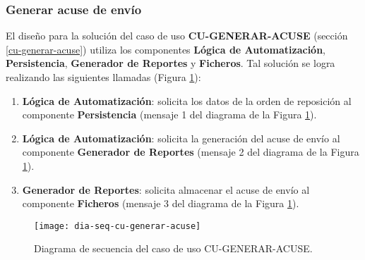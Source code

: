 \subsubsection{Generar acuse de envío}
El diseño para la solución del caso de uso \textbf{CU-GENERAR-ACUSE} (sección \ref{cu-generar-acuse}) utiliza los componentes \textbf{Lógica de Automatización}, \textbf{Persistencia}, \textbf{Generador de Reportes} y \textbf{Ficheros}. Tal solución se logra realizando las siguientes llamadas (Figura \ref{fig:dia-seq-cu-generar-acuse}):
\begin{enumerate}
	\item \textbf{Lógica de Automatización}: solicita los datos de la orden de reposición al componente \textbf{Persistencia} (mensaje 1 del diagrama de la Figura \ref{fig:dia-seq-cu-generar-acuse}).
	\item \textbf{Lógica de Automatización}: solicita la generación del acuse de envío al componente \textbf{Generador de Reportes} (mensaje 2 del diagrama de la Figura \ref{fig:dia-seq-cu-generar-acuse}).
	\item \textbf{Generador de Reportes}: solicita almacenar el acuse de envío al componente \textbf{Ficheros} (mensaje 3 del diagrama de la Figura \ref{fig:dia-seq-cu-generar-acuse}).
\end{enumerate}

\begin{figure}[h]
	\centering
	\texttt{[image: dia-seq-cu-generar-acuse]}
	\caption{Diagrama de secuencia del caso de uso CU-GENERAR-ACUSE.}
	\label{fig:dia-seq-cu-generar-acuse}
\end{figure}


